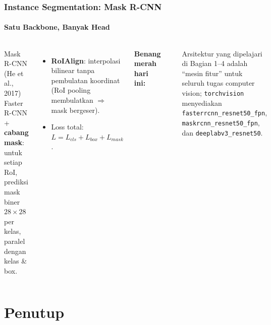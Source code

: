 \documentclass[t,aspectratio=169,xcolor=dvipsnames]{beamer}
\begin{document}
\begin{frame}
    \frametitle{Instance Segmentation: Mask R-CNN}
    \framesubtitle{Satu Backbone, Banyak Head}
    \footnotesize

    \begin{columns}[T]
        \begin{block}{Mask R-CNN (He et al., 2017)}
            Faster R-CNN + \textbf{cabang mask}: untuk setiap RoI, prediksi mask biner $28\times28$ per kelas, paralel dengan kelas \& box.
        \end{block}
        \begin{itemize}
            \item \textbf{RoIAlign}: interpolasi bilinear tanpa pembulatan koordinat (RoI pooling membulatkan $\Rightarrow$ mask bergeser).
            \item Loss total: $L = L_{cls} + L_{box} + L_{mask}$.
        \end{itemize}

        \textbf{Benang merah hari ini:}
        \begin{center}
        \end{center}
        {\scriptsize\color{dlMute} Arsitektur yang dipelajari di Bagian 1--4 adalah ``mesin fitur'' untuk seluruh tugas computer vision; \texttt{torchvision} menyediakan \texttt{fasterrcnn\_resnet50\_fpn}, \texttt{maskrcnn\_resnet50\_fpn}, dan \texttt{deeplabv3\_resnet50}.}
    \end{columns}
\end{frame}

\section*{Penutup}
\end{document}
